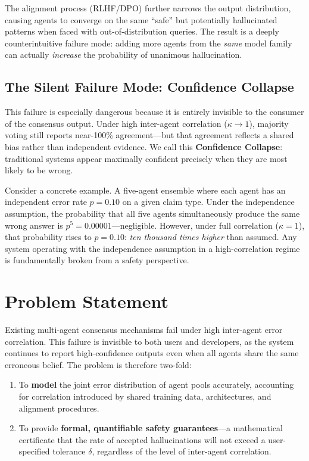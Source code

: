 \documentclass[12pt,a4paper]{report}
\begin{document}
The alignment process (RLHF/DPO) further narrows the output distribution, causing agents to converge on the same ``safe'' but potentially hallucinated patterns when faced with out-of-distribution queries. The result is a deeply counterintuitive failure mode: adding more agents from the \emph{same} model family can actually \emph{increase} the probability of unanimous hallucination.

\subsection{The Silent Failure Mode: Confidence Collapse}
This failure is especially dangerous because it is entirely invisible to the consumer of the consensus output. Under high inter-agent correlation ($\kappa \to 1$), majority voting still reports near-100\% agreement---but that agreement reflects a shared bias rather than independent evidence. We call this \textbf{Confidence Collapse}: traditional systems appear maximally confident precisely when they are most likely to be wrong.

Consider a concrete example. A five-agent ensemble where each agent has an independent error rate $p = 0.10$ on a given claim type. Under the independence assumption, the probability that all five agents simultaneously produce the same wrong answer is $p^5 = 0.00001$---negligible. However, under full correlation ($\kappa = 1$), that probability rises to $p = 0.10$: \emph{ten thousand times higher} than assumed. Any system operating with the independence assumption in a high-correlation regime is fundamentally broken from a safety perspective.

\section{Problem Statement}

Existing multi-agent consensus mechanisms fail under high inter-agent error correlation. This failure is invisible to both users and developers, as the system continues to report high-confidence outputs even when all agents share the same erroneous belief. The problem is therefore two-fold:

\begin{enumerate}
    \item To \textbf{model} the joint error distribution of agent pools accurately, accounting for correlation introduced by shared training data, architectures, and alignment procedures.
    \item To provide \textbf{formal, quantifiable safety guarantees}---a mathematical certificate that the rate of accepted hallucinations will not exceed a user-specified tolerance $\delta$, regardless of the level of inter-agent correlation.
\end{enumerate}
\end{document}
